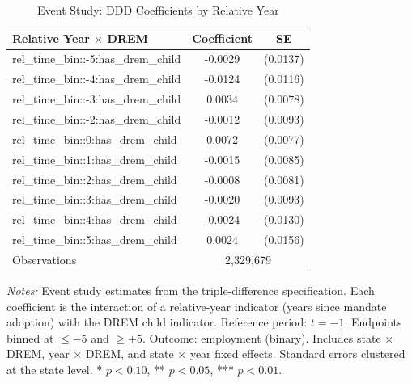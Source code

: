 \begin{table}[H]
\centering
\caption{Event Study: DDD Coefficients by Relative Year}
\begin{threeparttable}
\begin{tabular}{lcc}
\toprule
Relative Year $\times$ DREM & Coefficient & SE \\
\midrule
rel_time_bin::-5:has_drem_child & -0.0029 & (0.0137) \\
rel_time_bin::-4:has_drem_child & -0.0124 & (0.0116) \\
rel_time_bin::-3:has_drem_child & 0.0034 & (0.0078) \\
rel_time_bin::-2:has_drem_child & -0.0012 & (0.0093) \\
rel_time_bin::0:has_drem_child & 0.0072 & (0.0077) \\
rel_time_bin::1:has_drem_child & -0.0015 & (0.0085) \\
rel_time_bin::2:has_drem_child & -0.0008 & (0.0081) \\
rel_time_bin::3:has_drem_child & -0.0020 & (0.0093) \\
rel_time_bin::4:has_drem_child & -0.0024 & (0.0130) \\
rel_time_bin::5:has_drem_child & 0.0024 & (0.0156) \\
\midrule
Observations & \multicolumn{2}{c}{2,329,679} \\
\bottomrule
\end{tabular}
\begin{tablenotes}[flushleft]
\small
\item \textit{Notes:} Event study estimates from the triple-difference specification. Each coefficient is the interaction of a relative-year indicator (years since mandate adoption) with the DREM child indicator. Reference period: $t = -1$. Endpoints binned at $\leq -5$ and $\geq +5$. Outcome: employment (binary). Includes state $\times$ DREM, year $\times$ DREM, and state $\times$ year fixed effects. Standard errors clustered at the state level. * $p<0.10$, ** $p<0.05$, *** $p<0.01$.
\end{tablenotes}
\end{threeparttable}
\label{tab:eventstudy}
\end{table}

